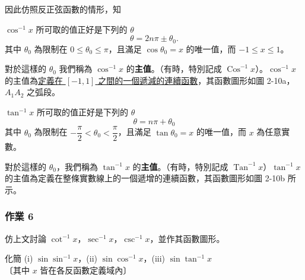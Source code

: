 
因此仿照反正弦函數的情形，知

\medskip
\begin{prop}\label{prop:b5-1-2}
$\cos^{-1} x$ 所可取的值正好是下列的 $\theta$
\[
\theta = 2n\pi \pm \theta_0.
\]
其中 $\theta_0$ 為限制在 $0 \le \theta_0 \le \pi$，且滿足 $\cos \theta_0 = x$ 的唯一值，而 $-1 \le x \le 1$。
\end{prop}

對於這樣的 $\theta_0$ 我們稱為 $\cos^{-1} x$ 的\textbf{主值}。（有時，特別記成 $\operatorname{Cos}^{-1} x$）。$\cos^{-1} x$ 的主值為\underline{定義在 $[-1, 1]$ 之}\underline{間的一個遞減的連續函數}，其函數圖形如圖 2-10a，$A_1 A_2$ 之弧段。

\medskip
\begin{prop}\label{prop:b5-1-3}
$\tan^{-1} x$ 所可取的值正好是下列的 $\theta$
\[
\theta = n\pi + \theta_0
\]
其中 $\theta_0$ 為限制在 \underline{$-\dfrac{\pi}{2} < \theta_0 < \dfrac{\pi}{2}$}，且滿足 $\tan \theta_0 = x$ 的唯一值，而 $x$ 為任意實數。
\end{prop}

對於這樣的 $\theta_0$，我們稱為 \underline{$\tan^{-1} x$} 的\textbf{主值}。（有時，特別記成 $\operatorname{Tan}^{-1} x$）$\tan^{-1} x$ 的主值為定義在整條實數線上的一個遞增的連續函數，其函數圖形如圖 2-10b 所示。

\medskip
\subsubsection*{作業 6}
仿上文討論 $\cot^{-1} x$，$\sec^{-1} x$，$\csc^{-1} x$，並作其函數圖形。

\medskip
\begin{example}\label{ex:b5-1-2-1}
化簡 (i) $\sin \sin^{-1} x$，(ii) $\sin \cos^{-1} x$，(iii) $\sin \tan^{-1} x$ \\
〔其中 $x$ 皆在各反函數定義域內〕
\end{example}
